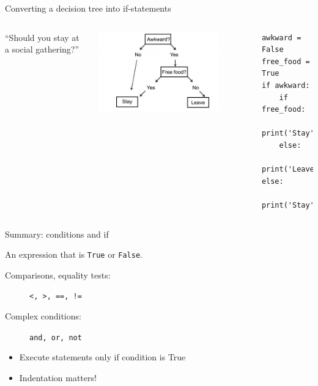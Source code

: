 \documentclass[aspectratio=169,usenames,dvipsnames]{beamer}
\begin{document}
\begin{frame}[fragile]{Converting a decision tree into if-statements}
    \begin{columns}
            ``Should you stay at a social gathering?''

            \includegraphics[width=0.8\textwidth]{fig/flowchart2}

        \pause
\begin{lstlisting}
awkward = False
free_food = True
if awkward:
    if free_food:
        print('Stay')
    else:
        print('Leave')
else:
    print('Stay')
\end{lstlisting}
\end{columns}
\end{frame}


\begin{frame}{Summary: conditions and if}
    \begin{description}[if-statements]
        \item[Conditions] An expression that is \texttt{True} or \texttt{False}.
            \begin{description}
                \item[Comparisons, equality tests:] \texttt{<, >, ==, !=}
                \item[Complex conditions:]          \texttt{and, or, not}
            \end{description}
        \item[if-statements]
            \begin{itemize}
                \item Execute statements only if condition is True
                \item Indentation matters!
            \end{itemize}
    \end{description}
\end{frame}
\end{document}
